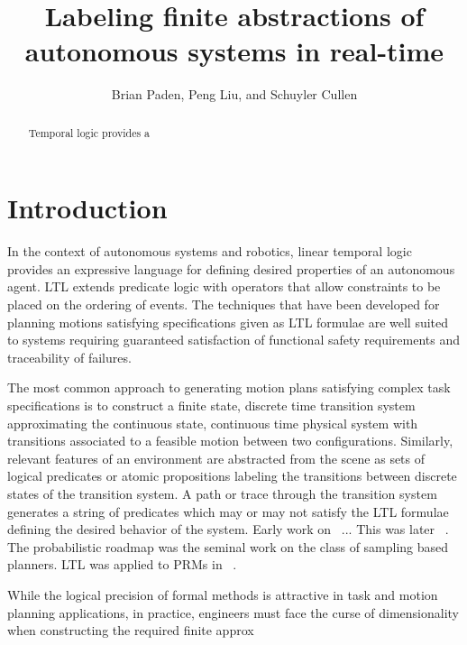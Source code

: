 \documentclass{llncs}
\begin{document}
\title{Labeling finite abstractions of autonomous systems in real-time}

\author{Brian Paden, Peng Liu, and Schuyler Cullen}
\maketitle
\begin{abstract}
%
Temporal logic provides a 
\end{abstract}
%

\section{Introduction}
In the context of autonomous systems and robotics, linear temporal logic provides an expressive language for defining desired properties of an autonomous agent. 
%
LTL extends predicate logic with operators that allow constraints to be placed on the ordering of events. 
%
The techniques that have been developed for planning motions satisfying specifications given as LTL formulae are well suited to systems requiring guaranteed satisfaction of functional safety requirements and traceability of failures.
%

The most common approach to generating motion plans satisfying complex task specifications is to construct a finite state, discrete time transition system approximating the continuous state, continuous time physical system with transitions associated to a feasible motion between two configurations. 
%
Similarly, relevant features of an environment are abstracted from the scene as sets of logical predicates or atomic propositions labeling the transitions between discrete states of the transition system.
%
A path or trace through the transition system generates a string of predicates which may or may not satisfy the LTL formulae defining the desired behavior of the system.
%
Early work on ~\cite{fainekos2005temporal}... This was later ~\cite{kress2009temporal}. The probabilistic roadmap was the seminal work on the class of sampling based planners. LTL was applied to PRMs in ~\cite{plaku2012path}.


While the logical precision of formal methods is attractive in task and motion planning applications, in practice, engineers must face the curse of dimensionality when constructing the required finite approx
\end{document}
